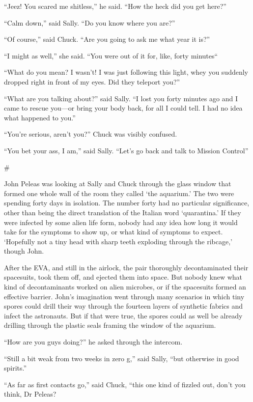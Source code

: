 \documentclass[12pt]{book}
\newcommand{\sbreak}{
\begin{center}
  \#
\end{center}
}
\begin{document}
``Jeez! You scared me shitless,'' he said. ``How the heck did you get here?''

``Calm down,'' said Sally. ``Do you know where you are?''

``Of course,'' said Chuck. ``Are you going to ask me what year it is?''

``I might as well,'' she said. ``You were out of it for, like, forty minutes``

``What do you mean? I wasn't! I was just following this light, whey you suddenly dropped right in front of my eyes. Did they teleport you?''

``What are you talking about?'' said Sally. ``I lost you forty minutes ago and I came to rescue you---or bring your body back, for all I could tell. I had no idea what happened to you.''

``You're serious, aren't you?'' Chuck was visibly confused. 

``You bet your ass, I am,'' said Sally. ``Let's go back and talk to Mission Control''

\sbreak

John Peleas was looking at Sally and Chuck through the glass window that formed one whole wall of the room they called `the aquarium.' The two were spending forty days in isolation. The number forty had no particular significance, other than being the direct translation of the Italian word `quarantina.' If they were infected by some alien life form, nobody had any idea how long it would take for the symptoms to show up, or what kind of symptoms to expect. `Hopefully not a tiny head with sharp teeth exploding through the ribcage,' though John.

After the EVA, and still in the airlock, the pair thoroughly decontaminated their spacesuits,  took them off, and ejected them into space. But nobody knew what kind of decontaminants worked on alien microbes, or if the spacesuits formed an effective barrier. John's imagination went through many scenarios in which tiny spores could drill their way through the fourteen layers of synthetic fabrics and infect the astronauts. But if that were true, the spores could as well be already drilling through the plastic seals framing the window of the aquarium. 

``How are you guys doing?'' he asked through the intercom. 

``Still a bit weak from two weeks in zero g,'' said Sally, ``but otherwise in good spirits.''

``As far as first contacts go,'' said Chuck, ``this one kind of fizzled out, don't you think, Dr Peleas?
\end{document}

